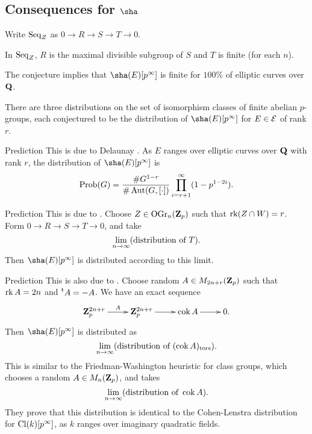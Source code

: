 \subsection{Consequences for \texorpdfstring{$\sha$}{Sha}}

Write $\operatorname{Seq}_Z$ as $0\to R \to S \to T \to 0$. 

\begin{prop}
In $\operatorname{Seq}_Z$, $R$ is the maximal divisible subgroup of $S$ and $T$ is 
finite (for each $n$). 
\end{prop}

\begin{coro}
The conjecture implies that $\sha(E)[p^\infty]$ is finite for 
$100\%$ of elliptic curves over $\mathbf{Q}$. 
\end{coro}

There are three distributions on the set of isomorphism classes of finite 
abelian $p$-groups, each conjectured to be the distribution of 
$\sha(E)[p^\infty]$ for $E\in \mathcal{E}$ of rank $r$. 

\begin{enonce}[remark]{Prediction}
This is due to Delaunay \cite{d01}. As $E$ ranges over elliptic curves over 
$\mathbf{Q}$ with rank $r$, the distribution of $\sha(E)[p^\infty]$ is 
\[
  \operatorname{Prob}(G) = \frac{\#G^{1-r}}{\#\operatorname{Aut}(G,[\cdot])}\prod_{i=r+1}^\infty (1-p^{1-2i}) .
\]
\end{enonce}

\begin{enonce}[remark]{Prediction}
This is due to \cite{bklpr13}. Choose 
$Z\in \operatorname{OGr}_n(\mathbf{Z}_p)$ such that $\operatorname{rk}(Z\cap W)=r$. Form 
$0 \to R\to S \to T\to 0$, and take 
\[
  \lim_{n\to \infty} (\textnormal{distribution of }T) .
\]
Then $\sha(E)[p^\infty]$ is distributed according to this limit. 
\end{enonce}

\begin{enonce}[remark]{Prediction}
This is also due to \cite{bklpr13}. Choose random $A\in M_{2n+r}(\mathbf{Z}_p)$ such 
that $\operatorname{rk} A=2n$ and $\prescript{\mathrm{t}}{}{A}=-A$. We have an exact sequence 
\[\xymatrix{
  \dZ_p^{2n+r} \ar[r]^-A 
    & \dZ_p^{2n+r} \ar[r] 
    & \coker A \ar[r] 
    & 0 .
}\]
Then $\sha(E)[p^\infty]$ is distributed as 
\[
  \lim_{n\to\infty} (\textnormal{distribution of }(\operatorname{cok} A)_\mathrm{tors}) .
\]
This is similar to the Friedman-Washington heuristic for class groups, 
which chooses a random $A\in M_n(\mathbf{Z}_p)$, and takes 
\[
  \lim_{n\to \infty} (\textnormal{distribution of }\operatorname{cok} A) .
\]
They prove that this distribution is identical to the Cohen-Lenstra 
distribution for $\operatorname{Cl}(k)[p^\infty]$, as $k$ ranges over imaginary quadratic 
fields. 
\end{enonce}

